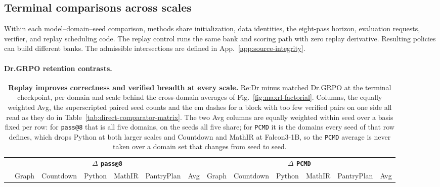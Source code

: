 \documentclass{article}
\newcommand{\1}{\mathbf 1}
\newcommand{\pmd}{\texttt{PCMD}}
\theoremstyle{remark}
\theoremstyle{definition}
\theoremstyle{plain}
\begin{document}
\subsection{Terminal comparisons across scales}
\label{app:scale-matrix}
\label{app:scale-snapshot}
\label{app:maxrl-scale-extensions}
\label{app:current-campaign-results}

Within each model--domain--seed comparison, methods share initialization,
data identities, the eight-pass horizon, evaluation requests, verifier, and
replay scheduling code. The replay control runs the same bank and scoring
path with zero replay derivative. Resulting policies can build different
banks. The admissible intersections are defined in
App.~\ref{app:source-integrity}.

\crossscaletablematerial

\paragraph{Dr.GRPO retention contrasts.}
\label{app:retention-numerical-detail}

\begin{table}[!tbp]
  \centering
  \caption{\textbf{Replay improves correctness and verified breadth at every
  scale.} Re:Dr minus matched Dr.GRPO at the terminal checkpoint, per domain
  and scale behind the cross-domain averages of
  Fig.~\ref{fig:maxrl-factorial}. Columns, the equally weighted Avg, the
  superscripted paired seed counts and the em dashes for a block with too few
  verified pairs on one side all read as they do in
  Table~\ref{tab:direct-comparator-matrix}. The two Avg columns are equally
  weighted within seed over a basis fixed per row: for \texttt{pass@8} that is
  all five domains, on the seeds all five share; for \pmd{} it is the domains
  every seed of that row defines, which drops Python at both larger scales and
  Countdown and MathIR at Falcon3-1B, so the \pmd{} average is never taken
  over a domain set that changes from seed to seed.}
  \label{tab:cross-scale-terminal-effects}
  \scriptsize
  \setlength{\tabcolsep}{1.4pt}
  \renewcommand{\arraystretch}{0.92}
  \begin{tabular}{@{}l*{12}{r}@{}}
    \toprule
    & \multicolumn{6}{c}{\textbf{$\Delta$ \texttt{pass@8}}}
      & \multicolumn{6}{c}{\textbf{$\Delta$ \pmd{}}} \\
    \cmidrule(lr){2-7}\cmidrule(l){8-13}
    & Graph & Countdown & Python & MathIR & PantryPlan & Avg
      & Graph & Countdown & Python & MathIR & PantryPlan & Avg \\
    \midrule
    
  \end{tabular}
\end{table}
\end{document}
